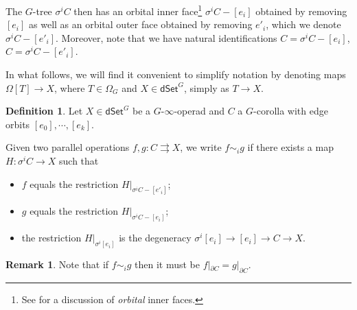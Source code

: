 \documentclass[a4paper,10pt
,draft
]{article}%
\numberwithin{equation}{section}
\numberwithin{figure}{section}
\theoremstyle{definition} %
\newtheorem{definition}[equation]{Definition}%
\newtheorem{remark}[equation]{Remark}%
\newcommand{\1}{\ensuremath{\mathbbm 1}}%
\begin{document}
The $G$-tree $\sigma^i C$ then has an orbital inner face\footnote{See \cite[Defn. 2.16]{BP_edss} for a discussion of \textit{orbital} inner faces.}
$\sigma^i C - [e_i]$ obtained by removing $[e_i]$
as well as an orbital outer face obtained by removing $e'_i$,
which we denote $\sigma^i C - [e'_i]$.
Moreover, note that we have natural identifications
$C = \sigma^i C - [e_i]$,
$C = \sigma^i C - [e'_i]$.

In what follows, we will find it convenient to simplify notation by denoting maps $\Omega[T] \to X$,
where $T \in \Omega_G$ and $X \in \mathsf{dSet}^G$,
simply as $T \to X$.


\begin{definition}
	Let $X \in \mathsf{dSet}^G$ be a $G$-$\infty$-operad and $C$ a $G$-corolla with edge orbits
	$[e_0],\cdots,[e_k]$.
	
	Given two parallel operations 
	$f,g\colon C \rightrightarrows X$,
	we write $f \sim_i g$ if there exists a map
	$H \colon \sigma^i C \to X$ such that
\begin{itemize}
\item $f$ equals the restriction $H|_{\sigma^i C-[e'_i]}$;
\item $g$ equals the restriction $H|_{\sigma^i C-[e_i]}$;
\item the restriction $H|_{\sigma^i [e_i]}$
is the degeneracy $\sigma^i [e_i] \to [e_i] \to C \to X$.
\end{itemize}
\end{definition}


\begin{remark}\label{HOMOTBOUND REM}
	Note that if $f \sim_i g$ then it must be
	$f|_{\partial C} = g|_{\partial C}$.
\end{remark}
\end{document}
